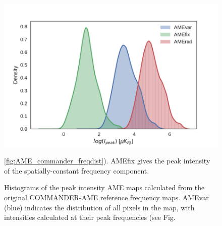        \begin{figure}
         \includegraphics[width=\textwidth]{../Plots/ch_allsky/AME_comps_distplot.pdf}
         \centering
         \caption{Histograms of the peak intensity AME maps calculated from the original COMMANDER-AME reference frequency maps. AMEvar (blue) indicates the distribution of all pixels in the map, with intensities calculated at their peak frequencies (see Fig.} \ref{fig:AME_commander_freqdist}). AMEfix gives the peak intensity of the spatially-constant frequency component.
         \label{fig:AME_comps_distplot}
       \end{figure}

